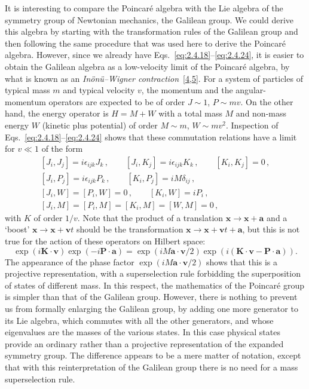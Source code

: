 It is interesting to compare the Poincar\'e algebra with the Lie algebra of the
symmetry group of Newtonian mechanics, the Galilean group. We could derive this
algebra by starting with the transformation rules of the Galilean group and
then following the same procedure that was used here to derive the Poincar\'e
algebra. However, since we already have Eqs.~\eqref{eq:2.4.18}--\eqref{eq:2.4.24}, it is easier
to obtain the Galilean algebra as a low-velocity limit of the Poincar\'e algebra,
by what is known as an \emph{In\"on\"u--Wigner contraction}~[\hyperref[ref:2.4]{4},\hyperref[ref:2.5]{5}].
For a system of particles of typical mass $m$ and typical velocity $v$, the
momentum and the angular-momentum operators are expected to be of order
$J\sim1$, $P\sim mv$. On the other hand, the energy operator is $H=M+W$ with a
total mass $M$ and non-mass energy $W$ (kinetic plus potential) of order
$M\sim m$, $W\sim mv^2$. Inspection of Eqs.~\eqref{eq:2.4.18}--\eqref{eq:2.4.24} shows that these
commutation relations have a limit for $v\ll1$ of the form
\[
\begin{gathered}
[J_i,J_j]=i\epsilon_{ijk}J_k\,,\qquad
[J_i,K_j]=i\epsilon_{ijk}K_k\,,\qquad
[K_i,K_j]=0\,,\\
[J_i,P_j]=i\epsilon_{ijk}P_k\,,\qquad
[K_i,P_j]=iM\delta_{ij}\,,\\
[J_i,W]=[P_i,W]=0\,,\qquad [K_i,W]=iP_i\,,\\
[J_i,M]=[P_i,M]=[K_i,M]=[W,M]=0\,,
\end{gathered}
\]
with $K$ of order $1/v$. Note that the product of a translation
$\mathbf{x}\to\mathbf{x}+\mathbf{a}$ and a `boost'
$\mathbf{x}\to\mathbf{x}+\mathbf{v}t$ should be the transformation
$\mathbf{x}\to\mathbf{x}+\mathbf{v}t+\mathbf{a}$, but this is not true for the
action of these operators on Hilbert space:
\[
\exp(i\mathbf{K}\cdot\mathbf{v})\exp(-i\mathbf{P}\cdot\mathbf{a})
=\exp(iM\mathbf{a}\cdot\mathbf{v}/2)
 \exp\!\left(i(\mathbf{K}\cdot\mathbf{v}-\mathbf{P}\cdot\mathbf{a})\right).
\]
The appearance of the phase factor $\exp(iM\mathbf{a}\cdot\mathbf{v}/2)$ shows
that this is a projective representation, with a superselection rule forbidding
the superposition of states of different mass. In this respect, the mathematics
of the Poincar\'e group is simpler than that of the Galilean group. However,
there is nothing to prevent us from formally enlarging the Galilean group, by
adding one more generator to its Lie algebra, which commutes with all the other
generators, and whose eigenvalues are the masses of the various states. In this
case physical states provide an ordinary rather than a projective
representation of the expanded symmetry group. The difference appears to be a
mere matter of notation, except that with this reinterpretation of the Galilean
group there is no need for a mass superselection rule.

